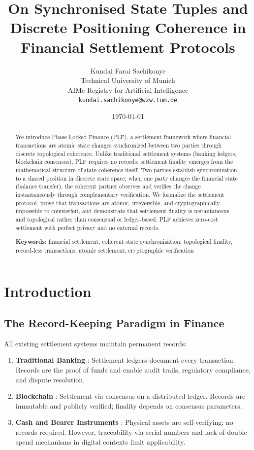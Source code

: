 \documentclass[twocolumn,10pt,a4paper]{article}
\title{\textbf{On Synchronised State Tuples and Discrete Positioning Coherence in Financial Settlement Protocols}}
\author{Kundai Farai Sachikonye\\
\small Technical University of Munich\\
\small AIMe Registry for Artificial Intelligence\\
\small \texttt{kundai.sachikonye@wzw.tum.de}}
\date{\today}
\theoremstyle{plain}
\theoremstyle{definition}
\providecommand{\keywords}[1]{\par\medskip\noindent\textbf{Keywords:} #1}
\begin{document}
\maketitle

\begin{abstract}
We introduce Phase-Locked Finance (PLF), a settlement framework where financial transactions are atomic state changes synchronized between two parties through discrete topological coherence. Unlike traditional settlement systems (banking ledgers, blockchain consensus), PLF requires no records: settlement finality emerges from the mathematical structure of state coherence itself. Two parties establish synchronization to a shared position in discrete state space; when one party changes the financial state (balance transfer), the coherent partner observes and verifies the change instantaneously through complementary verification. We formalize the settlement protocol, prove that transactions are atomic, irreversible, and cryptographically impossible to counterfeit, and demonstrate that settlement finality is instantaneous and topological rather than consensual or ledger-based. PLF achieves zero-cost settlement with perfect privacy and no external records.

\keywords{financial settlement, coherent state synchronization, topological finality, record-less transactions, atomic settlement, cryptographic verification}
\end{abstract}

\section{Introduction}

\subsection{The Record-Keeping Paradigm in Finance}

All existing settlement systems maintain permanent records:
\begin{enumerate}
\item \textbf{Traditional Banking} \cite{bank1998principles}: Settlement ledgers document every transaction. Records are the proof of funds and enable audit trails, regulatory compliance, and dispute resolution.
\item \textbf{Blockchain} \cite{nakamoto2008bitcoin,wood2014ethereum}: Settlement via consensus on a distributed ledger. Records are immutable and publicly verified; finality depends on consensus parameters.
\item \textbf{Cash and Bearer Instruments} \cite{rogoff2016curse}: Physical assets are self-verifying; no records required. However, traceability via serial numbers and lack of double-spend mechanisms in digital contexts limit applicability.
\end{enumerate}
\end{document}
